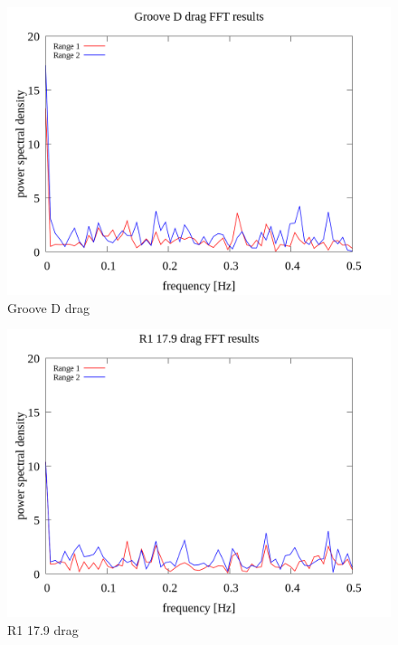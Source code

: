 \documentclass[a4paper]{jsarticle}
\begin{document}
\begin{figure}[htbp]
    \footnotesize
    \begin{center}
        \includegraphics[width=130mm]{../images/Groove_D_drag_08.png}
        \caption{Groove D drag}
    \end{center}
\end{figure}

\begin{figure}[htbp]
    \footnotesize
    \begin{center}
        \includegraphics[width=130mm]{../images/R1_17.9_drag_08.png}
        \caption{R1 17.9 drag}
    \end{center}
\end{figure}
\end{document}
